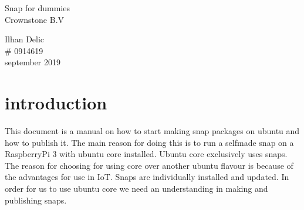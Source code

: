 \documentclass{article}
\begin{document}
\begin{titlepage}
		\begin{center}%
		{\huge{Snap for dummies}}\\ %
		[2cm]
		{\large Crownstone B.V }\\
		[15cm]
		\end{center} 
		\begin{flushright}
		{\large Ilhan Delic \\}
		\# 0914619 \\
		september 2019 \\
		\end{flushright}	
\end{titlepage}

\tableofcontents
\thispagestyle{empty}
\cleardoublepage %

\section{introduction}\label{sec:intro}%
This document is a manual on how to start making snap packages on ubuntu and how to publish it. The main reason for doing this is to run a selfmade snap on a RaspberryPi 3 with ubuntu core installed. Ubuntu core exclusively uses snaps. The reason for choosing for using core over another ubuntu flavour is because of the advantages for use in IoT. Snaps are individually installed and updated. In order for us to use ubuntu core we need an understanding in making and publishing snaps.\\ 



\newpage%
%
%
%
%
%
%
\end{document}
